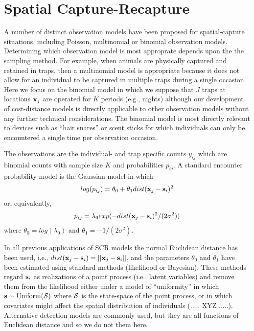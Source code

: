 \documentclass[12pt]{article}
\begin{document}
\section{Spatial Capture-Recapture}

A number of distinct observation models have been proposed for
spatial-capture situations, including Poisson, multinomial or binomial
observation models. Determining which observation model is most
approprate depends upon the the sampling method.
For example, when animals are physically captured and retained
in traps, then a multinomial model is appropriate because it does not
allow for an individual to be captured in multiple traps during a
single occasion. Here we focus on the binomial model in which we
suppose that $J$ traps at locations ${\bf x}_{j}$ are operated for $K$
periods (e.g., nights) although our development of cost-distance
models is directly applicable to other observation models without any
further technical considerations. The binomial model is most directly
relevant to devices such as ``hair snares''
\citep{woods_etal:1999,gardner_etal:2010} or scent sticks
\citep{kery_etal:2010} for which individuals can only be encountered a
single time per observation occasion.

The observations are the individual- and trap specific counts $y_{ij}$
which are binomial counts with sample size $K$ and probabilities
$p_{ij}$. A standard encounter probability model
\citep{borchers_efford:2008} is the Gaussian model in which
\begin{equation}
log(p_{ij})= \theta_{0} + \theta_{1} dist({\bf x}_{j} - {\bf s}_{i})^{2}
\label{eq.encounter}
\end{equation}
or, equivalently,
\[
p_{ij} = \lambda_{0} exp(-  dist({\bf x}_{j} - {\bf s}_{i})^{2}
/(2\sigma^{2}) )
\]
where $\theta_{0} = log(\lambda_{0})$ and $\theta_{1} =
-1/(2\sigma^2)$.

In all previous applications of SCR models the normal Euclidean
distance has been used, i.e., $ dist({\bf x}_{j} - {\bf s}_{i}) =
||{\bf x}_{j} - {\bf s}_{i}||$, and the parameters $\theta_0$ and
$\theta_1$ have been estimated using standard methods (likelihood or
Bayesian). These methods regard ${\bf s}_{i}$ as realizations of a
point process (i.e., latent variables) and remove them from the
likelihood either under a model of ``uniformity'' in which ${\bf s}
\sim \mbox{Uniform}({\cal S})$ where ${\cal S}$ is the state-space of
the point process, or in which covariates might affect the spatial
distribution of individuals (..... XYZ .....). Alternative detection
models are commonly used, but they are all functions of Euclidean
distance and so we do not them here.
\end{document}
